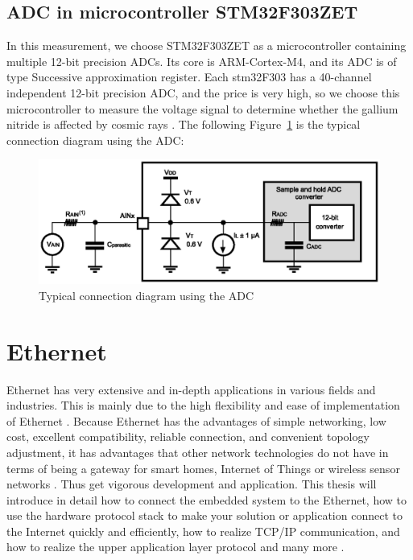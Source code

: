 \subsection{ADC in microcontroller STM32F303ZET}
\label{sec:ADC in microcontroller STM32F303ZET}
In this measurement, we choose STM32F303ZET as a microcontroller containing multiple 12-bit precision ADCs. Its core is ARM-Cortex-M4, and its ADC is of type Successive approximation register.
Each stm32F303 has a 40-channel independent 12-bit precision ADC, and the price is very high, so we choose this microcontroller to measure the voltage signal to determine whether the gallium nitride is affected by cosmic rays \cite{khanna20002}. The following Figure~\ref{fig:2.5} is the typical connection diagram using the ADC:
\begin{figure}[h]
	\centering
	\includegraphics{grafiken/2.5.eps}
	\caption{Typical connection diagram using the ADC} 
	\label{fig:2.5}
\end{figure}
\section{Ethernet}
\label{sec:Ethernet}
Ethernet has very extensive and in-depth applications in various fields and industries. This is mainly due to the high flexibility and ease of implementation of Ethernet \cite{spurgeon2000ethernet}. Because Ethernet has the advantages of simple networking, low cost, excellent compatibility, reliable connection, and convenient topology adjustment, it has advantages that other network technologies do not have in terms of being a gateway for smart homes, Internet of Things or wireless sensor networks \cite{norris2003gigabit}. Thus get vigorous development and application. This thesis will introduce in detail how to connect the embedded system to the Ethernet, how to use the hardware protocol stack to make your solution or application connect to the Internet quickly and efficiently, how to realize TCP/IP communication, and how to realize the upper application layer protocol and many more \cite{forouzan2002tcp}.
